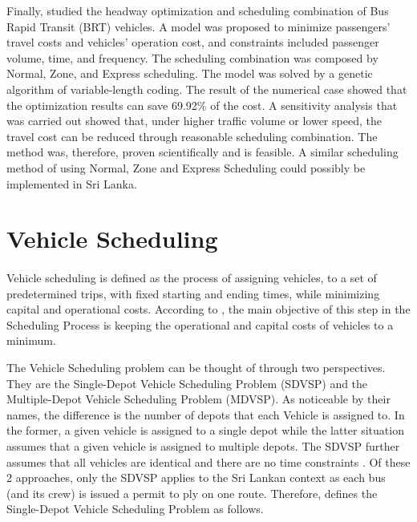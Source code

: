 \documentclass[12pt, oneside]{report}
\begin{document}
Finally, \citet{Sun2008} studied the headway optimization and scheduling combination of Bus Rapid Transit (BRT) vehicles. A model was proposed to minimize passengers' travel costs and vehicles' operation cost, and constraints included passenger volume, time, and frequency. The scheduling combination was composed by Normal, Zone, and Express scheduling. The model was solved by a genetic algorithm of variable-length coding. The result of the numerical case showed that the optimization results can save 69.92\% of the cost. A sensitivity analysis that was carried out showed that, under higher traffic volume or lower speed, the travel cost can be reduced through reasonable scheduling combination. The method was, therefore, proven scientifically and is feasible. A similar scheduling method of using Normal, Zone and Express Scheduling could possibly be implemented in Sri Lanka.

\section{Vehicle Scheduling}

\paragraph{ } Vehicle scheduling is defined as the process of assigning vehicles, to a set of predetermined trips, with fixed starting and ending times, while minimizing capital and operational costs. According to \citet{Freling2003}, the main objective of this step in the Scheduling Process is keeping the operational and capital costs of vehicles to a minimum.

The Vehicle Scheduling problem can be thought of through two perspectives. They are the Single-Depot Vehicle Scheduling Problem (SDVSP) and the Multiple-Depot Vehicle Scheduling Problem (MDVSP). As noticeable by their names, the difference is the number of depots that each Vehicle is assigned to. In the former, a given vehicle is assigned to a single depot while the latter situation assumes that a given vehicle is assigned to multiple depots. The SDVSP further assumes that all vehicles are identical and there are no time constraints \citep{Huisman2004}. Of these 2 approaches, only the SDVSP applies to the Sri Lankan context as each bus (and its crew) is issued a permit to ply on one route. Therefore, \citet{Freling2003} defines the Single-Depot Vehicle Scheduling Problem as follows.
\end{document}
